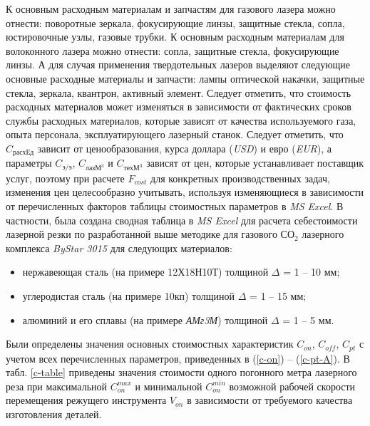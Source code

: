 \documentclass[11pt,twoside,openany]{report}
\begin{document}
К основным расходным материалам и запчастям
для газового лазера можно отнести:
поворотные зеркала, фокусирующие линзы,
защитные стекла, сопла, юстировочные узлы,
газовые трубки.
К основным расходным материалам для
волоконного лазера можно отнести:
сопла, защитные стекла, фокусирующие линзы.
А для случая применения твердотельных лазеров
выделяют следующие основные расходные материалы и запчасти:
лампы оптической накачки, защитные стекла, зеркала,
квантрон, активный элемент.
Следует отметить, что стоимость расходных материалов
может изменяться в зависимости от фактических сроков
службы расходных материалов,
которые зависят от качества используемого газа,
опыта персонала, эксплуатирующего лазерный станок.
Следует отметить, что
$C_\text{расхЕд}$
зависит от ценообразования, курса доллара
({\it USD}) и евро
({\it EUR}),
а параметры
$C_\text{э/э}$,
$C_{\text{лазМ}^3}$ и
$C_{\text{техМ}^3}$
зависят от цен, которые устанавливает поставщик услуг,
поэтому при расчете
$F_{cost}$
для конкретных производственных задач,
изменения цен целесообразно учитывать,
используя изменяющиеся в зависимости от перечисленных
факторов таблицы стоимостных параметров в
{\it MS Excel}.
В частности, была создана сводная таблица в
{\it MS Excel}
для расчета себестоимости лазерной резки по разработанной
выше методике для газового СО$_2$
лазерного комплекса
{\it ByStar 3015}
для следующих материалов:

\begin{itemize}
\item
нержавеющая сталь (на примере 12Х18Н10Т) толщиной $\Delta$ = 1 -- 10 мм;
\item
углеродистая сталь (на примере 10кп) толщиной $\Delta$ = 1 -- 15 мм;
\item
алюминий и его сплавы (на примере {\it АМг3М}) толщиной $\Delta$ = 1 -- 5 мм.
\end{itemize}

Были определены значения основных стоимостных характеристик
$C_{on}$, $C_{off}$, $C_{pt}$
с учетом всех перечисленных параметров, приведенных в
(\ref{c-on}) -- (\ref{c-pt-A}).
В табл. \ref{c-table} приведены значения стоимости
одного погонного метра лазерного реза при максимальной
$C_{on}^{max}$
и минимальной
$C_{on}^{min}$
возможной рабочей скорости перемещения режущего инструмента
$V_{on}$
в зависимости от требуемого качества изготовления деталей.
\end{document}
